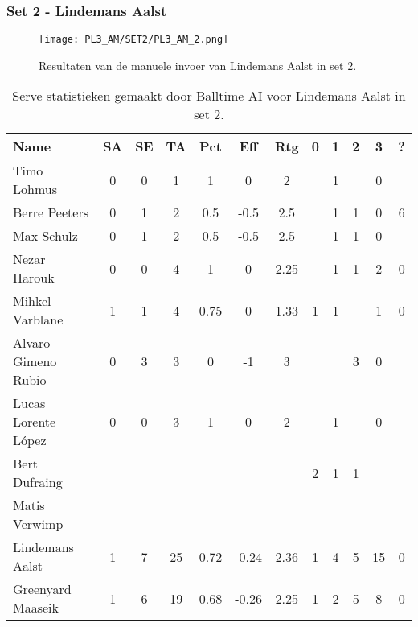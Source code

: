 \subsubsection{Set 2 - Lindemans Aalst}
\label{sec:PL3_Aalst2}
\begin{figure}
  \centering
  \texttt{[image: PL3\_AM/SET2/PL3\_AM\_2.png]}
  \caption{\label{fig:PL3_AM_2}Resultaten van de manuele invoer van Lindemans Aalst in set 2.}
\end{figure}

\begin{table}[ht!]
  \centering
  \scriptsize
  \begin{tabular}{|l|c|c|c|c|c|c|c|c|c|c|c|} \hline
    \textbf{Name} & SA & SE & TA & Pct & Eff & Rtg & 0 & 1 & 2 & 3 & ? \\ \hline
    Timo Lohmus & 0 & 0 & 1 & 1 & 0 & 2 &   & 1 &   & 0 &   \\
    Berre Peeters & 0 & 1 & 2 & 0.5 & -0.5 & 2.5 &   & 1 & 1 & 0 & 6 \\
    Max Schulz & 0 & 1 & 2 & 0.5 & -0.5 & 2.5 &   & 1 & 1 & 0 &   \\
    Nezar Harouk & 0 & 0 & 4 & 1 & 0 & 2.25 &   & 1 & 1 & 2 & 0 \\
    Mihkel Varblane & 1 & 1 & 4 & 0.75 & 0 & 1.33 & 1 & 1 &   & 1 & 0 \\
    Alvaro Gimeno Rubio & 0 & 3 & 3 & 0 & -1 & 3 &   &   & 3 & 0 &   \\
    Lucas Lorente López & 0 & 0 & 3 & 1 & 0 & 2 &   & 1 &   & 0 &   \\
    Bert Dufraing &   &   &   &   &   &   & 2 & 1 & 1 &   &   \\
    Matis Verwimp &   &   &   &   &   &   &   &   &   &   &   \\
    Lindemans Aalst & 1 & 7 & 25 & 0.72 & -0.24 & 2.36 & 1 & 4 & 5 & 15 & 0 \\
    Greenyard Maaseik & 1 & 6 & 19 & 0.68 & -0.26 & 2.25 & 1 & 2 & 5 & 8 & 0 \\ \hline
  \end{tabular}
  \caption[Serve statistieken gemaakt door Balltime AI voor Lindemans Aalst in set 2]{\label{tab:PL3ServeAalst2}Serve statistieken gemaakt door Balltime AI voor Lindemans Aalst in set 2.}
\end{table}

